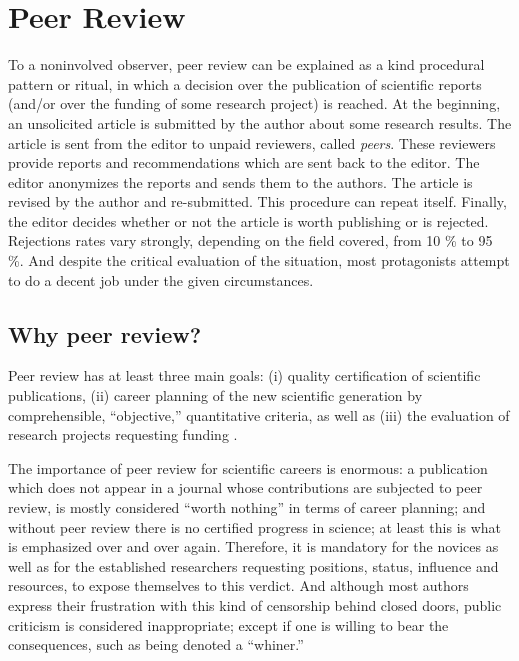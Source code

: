 \maketitle



\section{Peer Review}

To a noninvolved observer, peer review can be explained as a kind
procedural pattern or ritual, in which a decision over the publication
of scientific reports (and/or over the funding of some research
project) is reached.  At the beginning, an unsolicited article is
submitted by the author about some research results.  The article is
sent from the editor to unpaid reviewers, called {\it peers}.  These
reviewers provide reports and recommendations which are sent back to the
editor.  The editor anonymizes the reports and sends them to the
authors.  The article is revised by the author and re-submitted.  This
procedure can repeat itself.  Finally, the editor decides whether or not
the article is worth publishing or is rejected.  Rejections rates vary
strongly, depending on the field covered, from 10 \% to 95 \%.
And despite
the critical evaluation of the situation, most protagonists attempt to
do a decent job under the given circumstances.


\subsection{Why peer review?}

Peer review has at least three main goals:
(i) quality certification of scientific publications, (ii)
career planning of the new scientific generation by comprehensible,
``objective,'' quantitative criteria, as well as (iii) the evaluation of
 research projects requesting funding .

The importance of peer review for scientific careers is enormous:  a
publication which does not appear in a journal whose contributions are
subjected to peer review, is mostly considered ``worth nothing'' in
terms of career planning;  and without peer review there is no certified
progress in science; at least this is what is emphasized over and over
again.  Therefore, it is mandatory for the novices as well as for the
established researchers requesting positions, status, influence and
resources, to expose themselves to this verdict.  And although most
authors express their frustration with this kind of
censorship behind closed doors, public criticism is considered inappropriate; except if
one is willing to bear the consequences, such as being denoted a
``whiner.''



